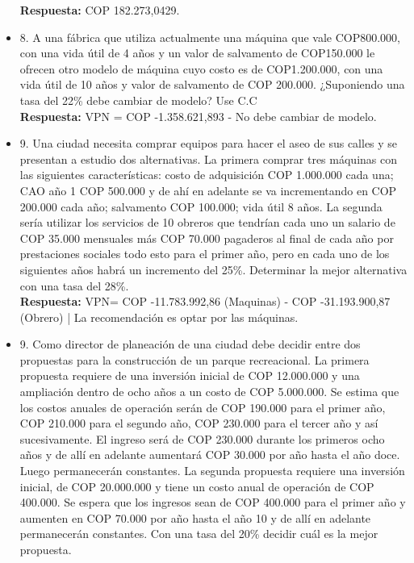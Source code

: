 \begin{itemize}
       \textbf{Respuesta:}  COP  182.273,0429.

       \medskip

 \item 8. A una fábrica que utiliza actualmente una máquina que vale COP800.000, con una vida útil de 4 años y un valor de salvamento de COP150.000 le ofrecen otro modelo de máquina cuyo costo es de COP1.200.000, con una vida útil de 10 años y valor de salvamento de  COP  200.000. ¿Suponiendo una tasa del 22\% debe cambiar de modelo? Use C.C \\

       \textbf{Respuesta:} VPN =  COP  -1.358.621,893 - No debe cambiar de modelo.

       \medskip

 \item 9. Una ciudad necesita comprar equipos para hacer el aseo de sus calles y se presentan a estudio dos alternativas. La primera comprar tres máquinas con las siguientes características: costo de adquisición COP 1.000.000 cada una; CAO año 1 COP 500.000 y de ahí en adelante se va incrementando en COP 200.000 cada año; salvamento COP 100.000; vida útil 8 años. La segunda sería utilizar los servicios de 10 obreros que tendrían cada uno un salario de COP 35.000 mensuales más COP 70.000 pagaderos al final de cada año por prestaciones sociales todo esto para el primer año, pero en cada uno de los siguientes años habrá un incremento del 25\%. Determinar la mejor alternativa con una tasa del 28\%. \\

       \textbf{Respuesta:} VPN=  COP  -11.783.992,86 (Maquinas) -  COP  -31.193.900,87 (Obrero) | La recomendación es optar por las máquinas.

       \medskip

 \item 9. Como director de planeación de una ciudad debe decidir entre dos propuestas para la construcción de un parque recreacional. La primera propuesta requiere de una inversión inicial de COP 12.000.000  y una ampliación dentro de ocho años a un costo de COP 5.000.000. Se estima que los costos anuales de operación serán de COP 190.000 para el primer año, COP 210.000 para el segundo año, COP 230.000 para el tercer año y así sucesivamente. El ingreso será de COP 230.000 durante los primeros ocho años y de allí en adelante aumentará COP 30.000 por año hasta el año doce. Luego permanecerán constantes. La segunda propuesta requiere una inversión inicial, de COP 20.000.000 y tiene un costo anual de operación de COP 400.000. Se espera que los ingresos sean de COP 400.000 para el primer año y aumenten en COP 70.000 por año hasta el año 10 y de allí en adelante permanecerán constantes. Con una tasa del 20\% decidir cuál es la mejor propuesta. \\


\end{itemize}
